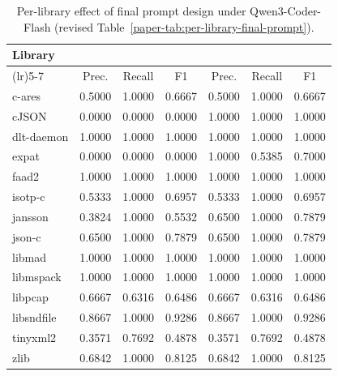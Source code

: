 \documentclass[onecolumn,11pt]{article}
\begin{document}
\begin{table}[!ht]
\centering
\footnotesize
\setlength{\tabcolsep}{2.6pt}
\renewcommand{\arraystretch}{1.08}
\caption{Per-library effect of final prompt design under Qwen3-Coder-Flash (revised Table~\ref{paper-tab:per-library-final-prompt}).}
\label{tab:per-library-final-prompt-response}
\begin{tabular*}{\linewidth}{@{\extracolsep{\fill}}>{\color{blue}}l>{\color{blue}}c>{\color{blue}}c>{\color{blue}}c>{\color{blue}}c>{\color{blue}}c>{\color{blue}}c}
\toprule
Library & \multicolumn{3}{c}{V3} & \multicolumn{3}{c}{V4} \\
\cmidrule(lr){2-4}\cmidrule(lr){5-7}
& Prec. & Recall & F1 & Prec. & Recall & F1 \\
\midrule
c-ares & 0.5000 & 1.0000 & 0.6667 & 0.5000 & 1.0000 & 0.6667 \\
cJSON & 0.0000 & 0.0000 & 0.0000 & 1.0000 & 1.0000 & 1.0000 \\
dlt-daemon & 1.0000 & 1.0000 & 1.0000 & 1.0000 & 1.0000 & 1.0000 \\
expat & 0.0000 & 0.0000 & 0.0000 & 1.0000 & 0.5385 & 0.7000 \\
faad2 & 1.0000 & 1.0000 & 1.0000 & 1.0000 & 1.0000 & 1.0000 \\
isotp-c & 0.5333 & 1.0000 & 0.6957 & 0.5333 & 1.0000 & 0.6957 \\
jansson & 0.3824 & 1.0000 & 0.5532 & 0.6500 & 1.0000 & 0.7879 \\
json-c & 0.6500 & 1.0000 & 0.7879 & 0.6500 & 1.0000 & 0.7879 \\
libmad & 1.0000 & 1.0000 & 1.0000 & 1.0000 & 1.0000 & 1.0000 \\
libmspack & 1.0000 & 1.0000 & 1.0000 & 1.0000 & 1.0000 & 1.0000 \\
libpcap & 0.6667 & 0.6316 & 0.6486 & 0.6667 & 0.6316 & 0.6486 \\
libsndfile & 0.8667 & 1.0000 & 0.9286 & 0.8667 & 1.0000 & 0.9286 \\
tinyxml2 & 0.3571 & 0.7692 & 0.4878 & 0.3571 & 0.7692 & 0.4878 \\
zlib & 0.6842 & 1.0000 & 0.8125 & 0.6842 & 1.0000 & 0.8125 \\
\bottomrule
\end{tabular*}
\end{table}
\end{document}
